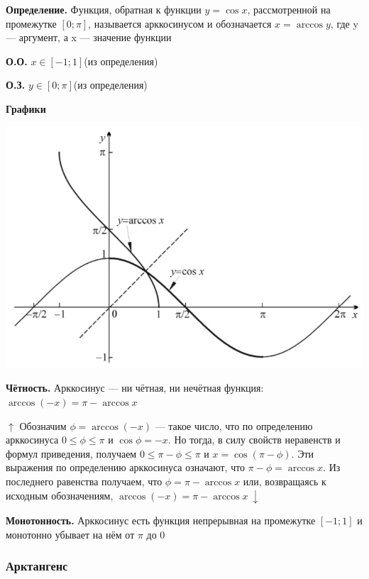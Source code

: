\documentclass{article}
\begin{document}
        \textbf{Определение.} Функция, обратная к функции \(y = \cos x\), рассмотренной на промежутке \([0; \pi]\), называется арккосинусом и обозначается \(x = \arccos y\), где y --- аргумент, а x --- значение функции
        
        \textbf{О.О.} \(x \in [-1; 1]\)(из определения)
        
        \textbf{О.З.} \(y \in [0; \pi]\)(из определения)
        
        \textbf{Графики}
        \begin{center}
            \includegraphics[scale=0.4]{5}
        \end{center}
        
        \textbf{Чётность.} Арккосинус --- ни чётная, ни нечётная функция: \(\arccos{(-x)} = \pi - \arccos x\)
        
        \(\uparrow\) Обозначим \(\phi = \arccos{(-x)}\) --- такое число, что по определению арккосинуса \(0 \leq \phi \leq \pi\) и \(\cos{\phi} = -x\). Но тогда, в силу свойств неравенств и формул приведения, получаем
        \(0 \leq \pi-\phi \leq \pi\) и \(x = \cos{(\pi - \phi)}\). Эти выражения по определению арккосинуса означают, что \(\pi-\phi = \arccos x\).
        Из последнего равенства получаем, что \(\phi = \pi-\arccos x\) или, возвращаясь к исходным обозначениям, \(\arccos{(-x)} = \pi - \arccos x \ \downarrow\)
        
        \textbf{Монотонность.} Арккосинус есть функция непрерывная на промежутке \([-1; 1]\) и монотонно убывает на нём от \(\pi\) до 0
        
        \subsubsection{Арктангенс}
        
\end{document}

